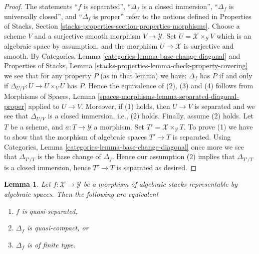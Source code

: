 \documentclass{stacks-project}
\theoremstyle{plain}
\newtheorem{lemma}[subsection]{Lemma}
\theoremstyle{definition}
\theoremstyle{remark}
\numberwithin{equation}{subsection}
\begin{document}
\begin{proof}
The statements
``$f$ is separated'',
``$\Delta_f$ is a closed immersion'',
``$\Delta_f$ is universally closed'', and
``$\Delta_f$ is proper''
refer to the notions defined in
Properties of Stacks,
Section \ref{stacks-properties-section-properties-morphisms}.
Choose a scheme $V$ and a surjective smooth morphism $V \to \mathcal{Y}$.
Set $U = \mathcal{X} \times_\mathcal{Y} V$ which is an algebraic
space by assumption, and the morphism $U \to \mathcal{X}$ is surjective
and smooth. By
Categories, Lemma \ref{categories-lemma-base-change-diagonal}
and
Properties of Stacks,
Lemma \ref{stacks-properties-lemma-check-property-covering}
we see that for any property $P$ (as in that lemma) we have:
$\Delta_f$ has $P$ if and only if $\Delta_{U/V} : U \to  U \times_V U$ has $P$.
Hence the equivalence of (2), (3) and (4) follows from
Morphisms of Spaces,
Lemma \ref{spaces-morphisms-lemma-separated-diagonal-proper}
applied to $U \to V$.
Moreover, if (1) holds, then $U \to V$ is separated and we see that
$\Delta_{U/V}$ is a closed immersion, i.e., (2) holds.
Finally, assume (2) holds. Let $T$ be a scheme, and $a : T \to \mathcal{Y}$
a morphism. Set $T' = \mathcal{X} \times_\mathcal{Y} T$. To prove
(1) we have to show that the morphism of algebraic spaces $T' \to T$
is separated. Using
Categories, Lemma \ref{categories-lemma-base-change-diagonal}
once more we see that $\Delta_{T'/T}$ is the base change of
$\Delta_f$. Hence our assumption (2) implies that $\Delta_{T'/T}$
is a closed immersion, hence $T' \to T$ is separated as desired.
\end{proof}

\begin{lemma}
\label{lemma-representable-quasi-separated-diagonal-quasi-compact}
Let $f : \mathcal{X} \to \mathcal{Y}$ be a morphism of algebraic stacks
representable by algebraic spaces. Then the following are equivalent
\begin{enumerate}
\item $f$ is quasi-separated,
\item $\Delta_f$ is quasi-compact, or
\item $\Delta_f$ is of finite type.
\end{enumerate}
\end{lemma}
\end{document}
